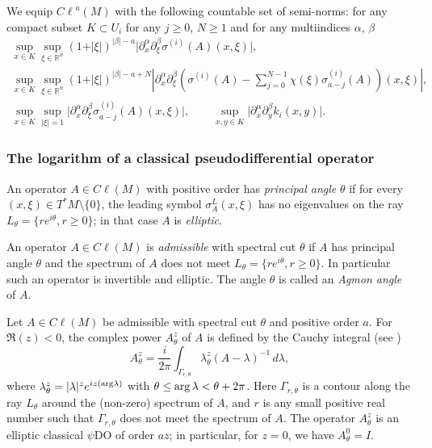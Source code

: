 \documentclass[pdftex]{sigma}
\def \Cl {{C\ell}}
\begin{document}
We equip ${\Cl}^{a}(M)$ with the following countable set of semi-norms: for any compact subset $K\subset U_i$ for any $j\geq 0$, $N\geq 1$ and for any multiindices $\alpha$, $\beta$
\begin{gather*}
 \sup\limits_{x\in K}\sup\limits_{
  \xi\in\mathbb{R}^n}(1+\vert\xi\vert)^{\vert\beta\vert-a}
  \big|\partial_x^{\alpha}\partial_{\xi}^{\beta} \sigma^{(i)}(A)(x,\xi)\big|,\\
 \sup\limits_{x\in K}\sup\limits_{
  \xi\in\mathbb{R}^n}(1+\vert\xi\vert)^{\vert\beta\vert-a+N}
  \left|\partial_x^{\alpha}\partial_{\xi}^{\beta} \left(\sigma^{(i)}(A)-\sum_{j=0}^{N-1}\chi(\xi)  \sigma_{a-j}^{(i)}(A)\right)(x,\xi)\right|,\\
 \sup\limits_{x\in K}\sup\limits_{ \vert\xi\vert=1}
  \big|\partial_x^{\alpha}\partial_{\xi}^{\beta}\sigma_{a-j}^{(i)}(A)(x,\xi)\big|,\qquad
 \sup\limits_{x,y\in K}
  \big|\partial_x^{\alpha}\partial_{y}^{\beta} k_i(x,y)\big|.
\end{gather*}

\subsubsection{The logarithm of a classical pseudodif\/ferential operator}

An operator $A \in \Cl(M)$ with positive order has \emph{principal angle} $\theta$ if for every $(x, \xi)\in T^*M\setminus\{0\}$, the leading symbol $\sigma_A^L(x, \xi)$ has no eigenvalues on the ray $L_\theta=\{re^{i\theta}, r\geq 0\}$; in that case $A$ is \emph{elliptic}.
\begin{definition}
An operator $A\in \Cl(M)$ is \emph{admissible} with spectral cut $\theta$ if $A$ has principal angle $\theta$ and the spectrum of $A$ does not meet $L_{\theta}=\{re^{i\theta}, r\geq 0\}$. In particular such an operator is invertible and elliptic. The angle $\theta$ is called an \emph{Agmon angle} of $A$.
\end{definition}
Let $A\in \Cl(M)$ be admissible with spectral cut $\theta$ and positive order $a$. For $\Re(z)<0$, the complex power $A_{\theta}^z$ of $A$ is
def\/ined by the Cauchy integral (see \cite{seeley})
\[
A_\theta^{z}=\frac{i}{2\pi} \int_{\Gamma_{r,\theta}} \lambda_\theta^{z} (A-\lambda)^{-1}\, d\lambda,
\]
where $\lambda_\theta^z= \vert \lambda\vert^z e^{iz {(\rm arg}\lambda)}$ with  $\theta\leq {\rm arg}\,\lambda<\theta+2\pi$. Here $\Gamma_{r,\theta}$ is a contour along the ray $L_\theta$ around the (non-zero) spectrum of $A$, and $r$ is any small positive real number such that $\Gamma_{r,\theta}$ does not meet the spectrum of $A$. The operator $A_{\theta}^z$ is an elliptic classical $\psi$DO of order $az$; in particular, for $z=0$, we have $ A_{\theta}^0 = I$.
\end{document}

